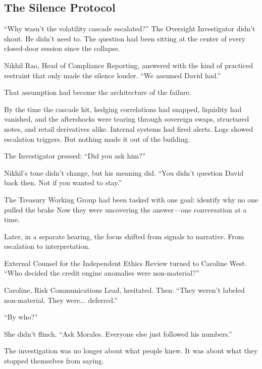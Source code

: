 \medskip

  
\subsection{The Silence Protocol}

“Why wasn’t the volatility cascade escalated?”
The Oversight Investigator didn’t shout. He didn’t need to. The question had been sitting at the center of every 
closed-door session since the collapse.

Nikhil Rao, Head of Compliance Reporting, answered with the kind of practiced restraint that only made the silence louder.
“We assumed David had.”

That assumption had become the architecture of the failure.

By the time the cascade hit, hedging correlations had snapped, liquidity had vanished, and the aftershocks were tearing 
through sovereign swaps, structured notes, and retail derivatives alike.
Internal systems had fired alerts.
Logs showed escalation triggers.
But nothing made it out of the building.

The Investigator pressed:
“Did you ask him?”

Nikhil’s tone didn’t change, but his meaning did.
“You didn’t question David back then. Not if you wanted to stay.”

The Treasury Working Group had been tasked with one goal:
identify why no one pulled the brake
Now they were uncovering the answer—one conversation at a time.

Later, in a separate hearing, the focus shifted from signals to narrative.
From escalation to interpretation.

External Counsel for the Independent Ethics Review turned to Caroline West.
“Who decided the credit engine anomalies were non-material?”

Caroline, Risk Communications Lead, hesitated. Then:
“They weren’t labeled non-material. They were... deferred.”

“By who?”

She didn’t flinch.
“Ask Morales. Everyone else just followed his numbers.”

The investigation was no longer about what people knew.
It was about what they stopped themselves from saying.

\medskip

